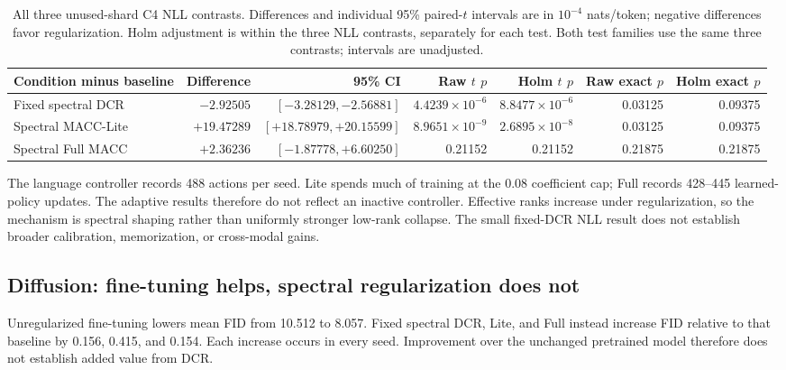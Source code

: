 \documentclass[a4paper,fleqn]{cas-dc}
\let\CAENLcaption\caption
\let\caption\CAENLcaption
\begin{document}
\begin{table}[pos=tbp]
\caption{All three unused-shard C4 NLL contrasts. Differences and individual
95\% paired-$t$ intervals are in $10^{-4}$ nats/token; negative differences
favor regularization. Holm adjustment is within the three NLL contrasts,
separately for each test. Both test families use the same three contrasts; intervals are unadjusted.}
\label{tab:c4_contrasts}
\centering\small
\begin{tabularx}{\textwidth}{@{}Yrrrrrr@{}}
\toprule
Condition minus baseline & Difference & 95\% CI &
Raw $t$ $p$ & Holm $t$ $p$ & Raw exact $p$ & Holm exact $p$ \\
\midrule
Fixed spectral DCR & $-2.92505$ & $[-3.28129,-2.56881]$ & $4.4239\times10^{-6}$ & $8.8477\times10^{-6}$ & 0.03125 & 0.09375 \\
Spectral MACC-Lite & $+19.47289$ & $[+18.78979,+20.15599]$ & $8.9651\times10^{-9}$ & $2.6895\times10^{-8}$ & 0.03125 & 0.09375 \\
Spectral Full MACC & $+2.36236$ & $[-1.87778,+6.60250]$ & 0.21152 & 0.21152 & 0.21875 & 0.21875 \\
\bottomrule
\end{tabularx}
\end{table}


The language controller records 488 actions per seed.
Lite spends much of training at the 0.08 coefficient cap;
Full records 428--445 learned-policy updates.
The adaptive results therefore do not reflect an inactive
controller. Effective ranks increase under regularization,
so the mechanism is spectral shaping rather than uniformly
stronger low-rank collapse.
The small fixed-DCR NLL result does not establish broader
calibration, memorization, or cross-modal gains.

\subsection{Diffusion: fine-tuning helps, spectral regularization does not}
\label{sec:diffusion_results}

Unregularized fine-tuning lowers mean FID from 10.512 to 8.057.
Fixed spectral DCR, Lite, and Full instead increase FID
relative to that baseline by 0.156, 0.415, and 0.154.
Each increase occurs in every seed.
Improvement over the unchanged pretrained model therefore
does not establish added value from DCR.
\end{document}
